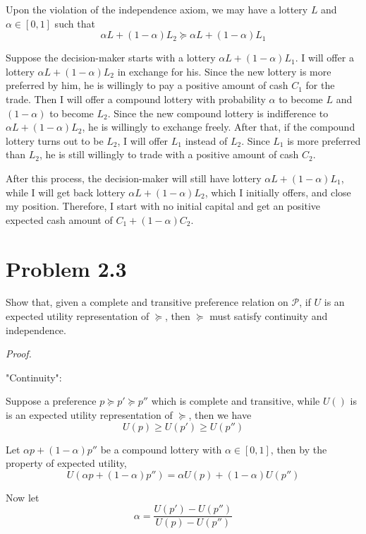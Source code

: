 \documentclass[a4paper]{article}
\begin{document}
Upon the violation of the independence axiom, we may have a lottery $L$ and $\alpha\in[0,1]$ such that
\[\alpha L + (1-\alpha)L_2 \succeq \alpha L + (1-\alpha) L_1\]

Suppose the decision-maker starts with a lottery $\alpha L + (1-\alpha) L_1$. I will offer a lottery $\alpha L + (1-\alpha)L_2$ in exchange for his. Since the new lottery is more preferred by him, he is willingly to pay a positive amount of cash $C_1$ for the trade. Then I will offer a compound lottery with probability $\alpha$ to become $L$ and $(1-\alpha)$ to become $L_2$. Since the new compound lottery is indifference to $\alpha L + (1-\alpha)L_2$, he is willingly to exchange freely. After that, if the compound lottery turns out to be $L_2$, I will offer $L_1$ instead of $L_2$. Since $L_1$ is more preferred than $L_2$, he is still willingly to trade with a positive amount of cash $C_2$.\newline

After this process, the decision-maker will still have lottery $\alpha L + (1-\alpha) L_1$, while I will get back lottery $\alpha L + (1-\alpha) L_2$, which I initially offers, and close my position. Therefore, I start with no initial capital and get an positive expected cash amount of $C_1+(1-\alpha)C_2$.

\section{Problem 2.3}

Show that, given a complete and transitive preference relation on $\mathcal{P}$, if $U$ is an expected utility representation of $\succeq$, then $\succeq$ must satisfy continuity and independence.\newline

\textit{Proof.}\newline

"Continuity":\newline

Suppose a preference $p \succeq p' \succeq p''$ which is complete and transitive, while $U()$ is is an expected utility representation of $\succeq$, then we have
\[U(p)\geq U(p')\geq U(p'')\]

Let $\alpha p+(1-\alpha)p''$ be a compound lottery with $\alpha\in[0,1]$, then by the property of expected utility,
\[U(\alpha p+(1-\alpha)p'')=\alpha U(p)+(1-\alpha)U(p'')\]

Now let
\[\alpha=\frac{U(p')-U(p'')}{U(p)-U(p'')}\]
\end{document}
